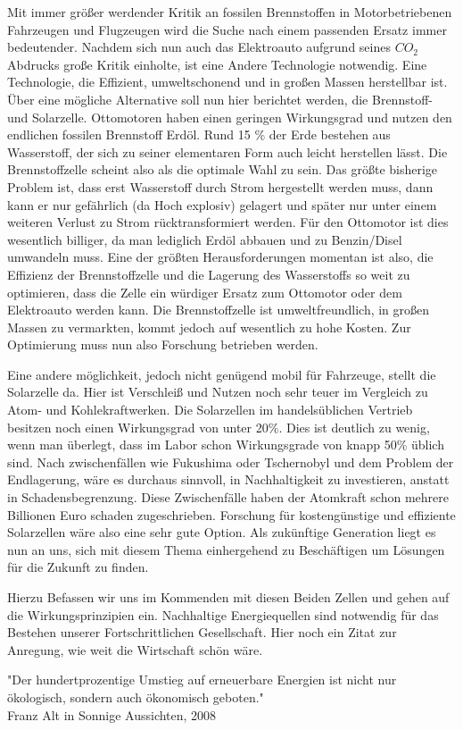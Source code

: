 Mit immer größer werdender Kritik an fossilen Brennstoffen in Motorbetriebenen Fahrzeugen und Flugzeugen wird die Suche nach einem passenden Ersatz immer bedeutender. Nachdem sich nun auch das Elektroauto aufgrund seines $CO_2$ Abdrucks große Kritik einholte, ist eine Andere Technologie notwendig. Eine Technologie, die Effizient, umweltschonend und in großen Massen herstellbar ist.
Über eine mögliche Alternative soll nun hier berichtet werden, die Brennstoff- und Solarzelle.
Ottomotoren haben einen geringen Wirkungsgrad und nutzen den endlichen fossilen Brennstoff Erdöl.
Rund 15 \% der Erde bestehen aus Wasserstoff, der sich zu seiner elementaren Form auch leicht herstellen lässt.
Die Brennstoffzelle scheint also als die optimale Wahl zu sein.
Das größte bisherige Problem ist, dass erst Wasserstoff durch Strom hergestellt werden muss, dann kann er nur gefährlich (da Hoch explosiv) gelagert und später nur unter einem weiteren Verlust zu Strom rücktransformiert werden.
Für den Ottomotor ist dies wesentlich billiger, da man lediglich Erdöl abbauen und zu Benzin/Disel umwandeln muss.
Eine der größten Herausforderungen momentan ist also, die Effizienz der Brennstoffzelle und die Lagerung des Wasserstoffs so weit zu optimieren, dass die Zelle ein würdiger Ersatz zum Ottomotor oder dem Elektroauto werden kann.
Die Brennstoffzelle ist umweltfreundlich, in großen Massen zu vermarkten, kommt jedoch auf wesentlich zu hohe Kosten.
Zur Optimierung muss nun also Forschung betrieben werden.

Eine andere möglichkeit, jedoch nicht genügend mobil für Fahrzeuge, stellt die Solarzelle da.
Hier ist Verschleiß und Nutzen noch sehr teuer im Vergleich zu Atom- und Kohlekraftwerken.
Die Solarzellen im handelsüblichen Vertrieb besitzen noch einen Wirkungsgrad von unter 20\%.
Dies ist deutlich zu wenig, wenn man überlegt, dass im Labor schon Wirkungsgrade von knapp 50\% üblich sind. 
Nach zwischenfällen wie Fukushima oder Tschernobyl und dem Problem der Endlagerung, wäre es durchaus sinnvoll, in Nachhaltigkeit zu investieren, anstatt in Schadensbegrenzung. Diese Zwischenfälle haben der Atomkraft schon mehrere Billionen Euro schaden zugeschrieben.
Forschung für kostengünstige und effiziente Solarzellen wäre also eine sehr gute Option.
Als zukünftige Generation liegt es nun an uns, sich mit diesem Thema einhergehend zu Beschäftigen um Lösungen für die Zukunft zu  finden.

Hierzu Befassen wir uns im Kommenden mit diesen Beiden Zellen und gehen auf die Wirkungsprinzipien ein.
Nachhaltige Energiequellen sind notwendig für das Bestehen unserer Fortschrittlichen Gesellschaft.
Hier noch ein Zitat zur Anregung, wie weit die Wirtschaft schön wäre.
\begin{center}
"Der hundertprozentige Umstieg auf erneuerbare Energien ist nicht nur ökologisch, sondern auch ökonomisch geboten."\\
Franz Alt in Sonnige Aussichten, 2008 
\end{center}
